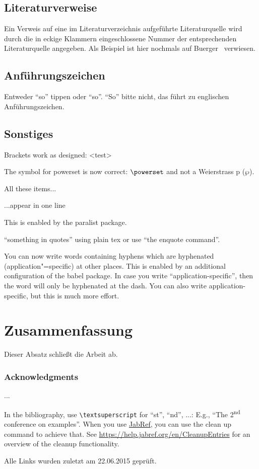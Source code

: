 \documentclass[runningheads,a4paper]{llncs}[2015/06/24]
\begin{document}
\subsection{Literaturverweise}
Ein Verweis auf eine im Literaturverzeichnis aufgeführte
Literaturquelle wird durch die in eckige Klammern eingeschlossene
Nummer der entsprechenden Literaturquelle angegeben. Als Beispiel ist
hier nochmals auf Buerger~\cite{buerger} verwiesen.

\subsection{Anführungszeichen}
Entweder "`so"' tippen oder \enquote{so}.
``So'' bitte nicht, das führt zu englischen Anführungszeichen.

\subsection{Sonstiges}
Brackets work as designed:
<test>

The symbol for powerset is now correct: $\powerset$ and not a Weierstrass p ($\wp$).

\begin{inparaenum}
\item All these items...
\item ...appear in one line
\item This is enabled by the paralist package.
\end{inparaenum}

``something in quotes'' using plain tex or use \enquote{the enquote command}.

You can now write words containing hyphens which are hyphenated (application"=specific) at other places.
This is enabled by an additional configuration of the babel package.
In case you write \enquote{application-specific}, then the word will only be hyphenated at the dash.
You can also write applica\allowbreak{}tion-specific, but this is much more effort.

\section{Zusammenfassung}
\label{sec:zusfas}
Dieser Absatz schließt die Arbeit ab.

\subsubsection*{Acknowledgments}
...

In the bibliography, use \texttt{\textbackslash textsuperscript} for ``st'', ``nd'', ...:
E.g., \enquote{The 2\textsuperscript{nd} conference on examples}.
When you use \href{https://www.jabref.org}{JabRef}, you can use the clean up command to achieve that.
See \url{https://help.jabref.org/en/CleanupEntries} for an overview of the cleanup functionality.




Alle Links wurden zuletzt am 22.06.2015 geprüft.
\end{document}
